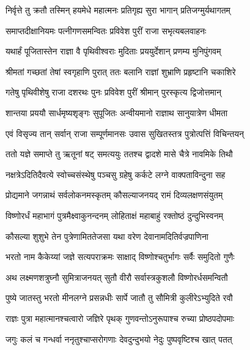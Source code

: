 
\twolineshloka
{निर्वृत्ते तु क्रतौ तस्मिन् हयमेधे महात्मनः}
{प्रतिगृह्य सुरा भागान् प्रतिजग्मुर्यथागतम्} %

\twolineshloka
{समाप्तदीक्षानियमः पत्नीगणसमन्वितः}
{प्रविवेश पुरीं राजा सभृत्यबलवाहनः} %

\twolineshloka
{यथार्हं पूजितास्तेन राज्ञा वै पृथिवीश्वराः}
{मुदिताः प्रययुर्देशान् प्रणम्य मुनिपुंगवम्} %

\twolineshloka
{श्रीमतां गच्छतां तेषां स्वगृहाणि पुरात् ततः}
{बलानि राज्ञां शुभ्राणि प्रहृष्टानि चकाशिरे} %

\twolineshloka
{गतेषु पृथिवीशेषु राजा दशरथः पुनः}
{प्रविवेश पुरीं श्रीमान् पुरस्कृत्य द्विजोत्तमान्} %

\twolineshloka
{शान्तया प्रययौ सार्धमृष्यशृङ्गः सुपूजितः}
{अन्वीयमानो राज्ञाथ सानुयात्रेण धीमता} %

\twolineshloka
{एवं विसृज्य तान् सर्वान् राजा सम्पूर्णमानसः}
{उवास सुखितस्तत्र पुत्रोत्पत्तिं विचिन्तयन्} %

\twolineshloka
{ततो यज्ञे समाप्ते तु ऋतूनां षट् समत्ययुः}
{ततश्च द्वादशे मासे चैत्रे नावमिके तिथौ} %

\twolineshloka
{नक्षत्रेऽदितिदैवत्ये स्वोच्चसंस्थेषु पञ्चसु}
{ग्रहेषु कर्कटे लग्ने वाक्पताविन्दुना सह} %

\twolineshloka
{प्रोद्यमाने जगन्नाथं सर्वलोकनमस्कृतम्}
{कौसल्याजनयद् रामं दिव्यलक्षणसंयुतम्} %

\twolineshloka
{विष्णोरर्धं महाभागं पुत्रमैक्ष्वाकुनन्दनम्}
{लोहिताक्षं महाबाहुं रक्तोष्ठं दुन्दुभिस्वनम्} %

\twolineshloka
{कौसल्या शुशुभे तेन पुत्रेणामिततेजसा}
{यथा वरेण देवानामदितिर्वज्रपाणिना} %

\twolineshloka
{भरतो नाम कैकेय्यां जज्ञे सत्यपराक्रमः}
{साक्षाद् विष्णोश्चतुर्भागः सर्वैः समुदितो गुणैः} %

\twolineshloka
{अथ लक्ष्मणशत्रुघ्नौ सुमित्राजनयत् सुतौ}
{वीरौ सर्वास्त्रकुशलौ विष्णोरर्धसमन्वितौ} %

\twolineshloka
{पुष्ये जातस्तु भरतो मीनलग्ने प्रसन्नधीः}
{सार्पे जातौ तु सौमित्री कुलीरेऽभ्युदिते रवौ} %

\twolineshloka
{राज्ञः पुत्रा महात्मानश्चत्वारो जज्ञिरे पृथक्}
{गुणवन्तोऽनुरूपाश्च रुच्या प्रोष्ठपदोपमाः} %

\twolineshloka
{जगुः कलं च गन्धर्वा ननृतुश्चाप्सरोगणाः}
{देवदुन्दुभयो नेदुः पुष्पवृष्टिश्च खात् पतत्} %


